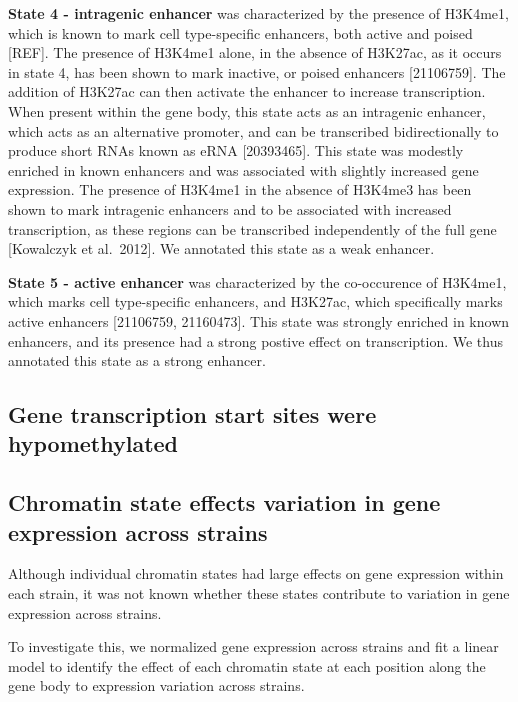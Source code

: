 \documentclass[10pt,letterpaper]{article}
\begin{document}
\textbf{State 4 - intragenic enhancer} was characterized by the presence
of H3K4me1, which is known to mark cell type-specific enhancers, both
active and poised {[}REF{]}. The presence of H3K4me1 alone, in the
absence of H3K27ac, as it occurs in state 4, has been shown to mark
inactive, or poised enhancers {[}21106759{]}. The addition of H3K27ac
can then activate the enhancer to increase transcription. When present
within the gene body, this state acts as an intragenic enhancer, which
acts as an alternative promoter, and can be transcribed bidirectionally
to produce short RNAs known as eRNA {[}20393465{]}. This state was
modestly enriched in known enhancers and was associated with slightly
increased gene expression. The presence of H3K4me1 in the absence of
H3K4me3 has been shown to mark intragenic enhancers and to be associated
with increased transcription, as these regions can be transcribed
independently of the full gene {[}Kowalczyk et al.~2012{]}. We annotated
this state as a weak enhancer.

\textbf{State 5 - active enhancer} was characterized by the co-occurence
of H3K4me1, which marks cell type-specific enhancers, and H3K27ac, which
specifically marks active enhancers {[}21106759, 21160473{]}. This state
was strongly enriched in known enhancers, and its presence had a strong
postive effect on transcription. We thus annotated this state as a
strong enhancer.

\hypertarget{gene-transcription-start-sites-were-hypomethylated}{%
\subsection{Gene transcription start sites were
hypomethylated}\label{gene-transcription-start-sites-were-hypomethylated}}

\hypertarget{chromatin-state-effects-variation-in-gene-expression-across-strains}{%
\subsection{Chromatin state effects variation in gene expression across
strains}\label{chromatin-state-effects-variation-in-gene-expression-across-strains}}

Although individual chromatin states had large effects on gene
expression within each strain, it was not known whether these states
contribute to variation in gene expression across strains.

To investigate this, we normalized gene expression across strains and
fit a linear model to identify the effect of each chromatin state at
each position along the gene body to expression variation across
strains.
\end{document}

